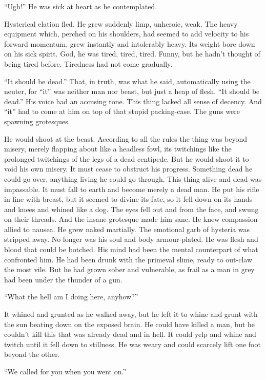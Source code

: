 ``Ugh!'' He was sick at heart as he contemplated.

Hysterical elation fled. He grew suddenly limp, unheroic, weak. The heavy equipment which, perched on his shoulders, had seemed to add velocity to his forward momentum, grew instantly and intolerably heavy. Its weight bore down on his sick spirit. God, he was tired, tired, tired. Funny, but he hadn't thought of being tired before. Tiredness had not come gradually.

``It should be dead.'' That, in truth, was what he said, automatically using the neuter, for ``it'' was neither man nor beast, but just a heap of flesh. ``It should be dead.'' His voice had an accusing tone. This thing lacked all sense of decency. And ``it'' had to come at him on top of that stupid packing-case. The guns were spawning grotesques.

He would shoot at the beast. According to all the rules the thing was beyond misery, merely flapping about like a headless fowl, its twitchings like the prolonged twitchings of the legs of a dead centipede. But he would shoot it to void his own misery. It must cease to obstruct his progress. Something dead he could go over, anything living he could go through. This thing alive and dead was impassable. It must fall to earth and become merely a dead man. He put his rifle in line with breast, but it seemed to divine its fate, so it fell down on its hands and knees and whined like a dog. The eyes fell out and from the face, and swung on their threads. And the insane grotesque made him sane. He knew compassion allied to nausea. He grew naked martially. The emotional garb of hysteria was stripped away. No longer was his soul and body armour-plated. He was flesh and blood that could be botched. His mind had been the mental counterpart of what confronted him. He had been drunk with the primeval slime, ready to out-claw the most vile. But he had grown sober and vulnerable, as frail as a man in grey had been under the thunder of a gun.

``What the hell am I doing here, anyhow?''

It whined and grunted as he walked away, but he left it to whine and grunt with the sun beating down on the exposed brain. He could have killed a man, but he couldn't kill this that was already dead and in hell. It could yelp and whine and twitch until it fell down to stillness. He was weary and could scarcely lift one foot beyond the other.

``We called for you when you went on.''

